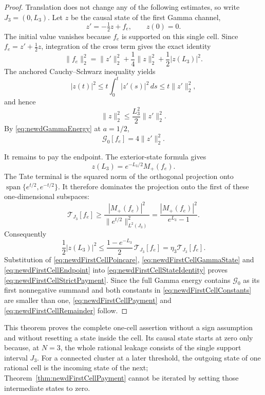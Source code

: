 \documentclass[11pt]{amsart}
\theoremstyle{definition}
\theoremstyle{remark}
\begin{document}
\begin{proof}
Translation does not change any of the following estimates, so write
$J_3=(0,L_3)$.  Let $z$ be the causal state of the first Gamma channel,
\[
 z'=-\tfrac12z+f_e,
 \qquad z(0)=0.
\]
The initial value vanishes because $f_e$ is supported on this single cell.
Since $f_e=z'+\tfrac12z$, integration of the cross term gives the exact
identity
\begin{equation}\label{eq:newdFirstCellStateIdentity}
 \|f_e\|_2^2
 =\|z'\|_2^2+\frac14\|z\|_2^2+\frac12|z(L_3)|^2.
\end{equation}
The anchored Cauchy--Schwarz inequality yields
\[
 |z(t)|^2
 \leq t\int_0^t|z'(s)|^2\,ds
 \leq t\|z'\|_2^2,
\]
and hence
\begin{equation}\label{eq:newdFirstCellPoincare}
 \|z\|_2^2\leq\frac{L_3^2}{2}\|z'\|_2^2.
\end{equation}
By \eqref{eq:newdGammaEnergy} at $a=1/2$,
\begin{equation}\label{eq:newdFirstCellGammaState}
 \mathcal G_0[f_e]=4\|z'\|_2^2.
\end{equation}

It remains to pay the endpoint.  The exterior-state formula gives
\[
 z(L_3)=e^{-L_3/2}M_+(f_e).
\]
The Tate terminal is the squared norm of the orthogonal projection onto
$\operatorname{span}\{e^{t/2},e^{-t/2}\}$.  It therefore dominates the
projection onto the first of these one-dimensional subspaces:
\begin{equation}\label{eq:newdFirstCellTateProjection}
 \mathcal T_{J_3}[f_e]
 \geq\frac{|M_+(f_e)|^2}{\|e^{t/2}\|_{L^2(J_3)}^2}
 =\frac{|M_+(f_e)|^2}{e^{L_3}-1}.
\end{equation}
Consequently
\begin{equation}\label{eq:newdFirstCellEndpoint}
 \frac12|z(L_3)|^2
 \leq\frac{1-e^{-L_3}}2\,\mathcal T_{J_3}[f_e]
 =\eta_3\mathcal T_{J_3}[f_e].
\end{equation}
Substitution of \eqref{eq:newdFirstCellPoincare},
\eqref{eq:newdFirstCellGammaState} and
\eqref{eq:newdFirstCellEndpoint} into
\eqref{eq:newdFirstCellStateIdentity} proves
\eqref{eq:newdFirstCellStrictPayment}.  Since the full Gamma energy contains
$\mathcal G_0$ as its first nonnegative summand and both constants in
\eqref{eq:newdFirstCellConstants} are smaller than one,
\eqref{eq:newdFirstCellPayment} and
\eqref{eq:newdFirstCellRemainder} follow.
\end{proof}

This theorem proves the complete one-cell assertion without a sign
assumption and without resetting a state inside the cell.  Its causal state
starts at zero only because, at $N=3$, the whole rational leakage consists
of the single support interval $J_3$.  For a connected cluster at a later
threshold, the outgoing state of one rational cell is the incoming state of
the next; Theorem~\ref{thm:newdFirstCellPayment} cannot be iterated by
setting those intermediate states to zero.
\end{document}
